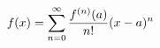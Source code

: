 \documentclass[preview]{standalone}
\begin{document}
\begin{align*}
\special{dvisvgm:raw <g id='unique000'>}f(x) = \sum_{n=0}^{\infty} \frac{f^{(n)}(a)}{n!}(x-a)^n\special{dvisvgm:raw </g>}
\end{align*}
\end{document}
